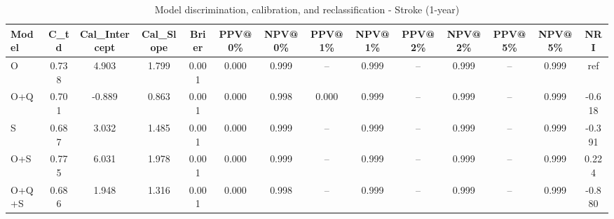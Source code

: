 \begin{table}[htbp]
\centering
\small
\caption{Model discrimination, calibration, and reclassification - Stroke (1-year)}
\label{tab:perf_stroke_1y}
\begin{tabular}{lccccccccccccc}
\toprule
Model & C\_td & Cal\_Intercept & Cal\_Slope & Brier & PPV@0\% & NPV@0\% & PPV@1\% & NPV@1\% & PPV@2\% & NPV@2\% & PPV@5\% & NPV@5\% & NRI \\
\midrule
O & 0.738 & 4.903 & 1.799 & 0.001 & 0.000 & 0.999 & -- & 0.999 & -- & 0.999 & -- & 0.999 & ref \\
O+Q & 0.701 & -0.889 & 0.863 & 0.001 & 0.000 & 0.998 & 0.000 & 0.999 & -- & 0.999 & -- & 0.999 & -0.618 \\
S & 0.687 & 3.032 & 1.485 & 0.001 & 0.000 & 0.999 & -- & 0.999 & -- & 0.999 & -- & 0.999 & -0.391 \\
O+S & 0.775 & 6.031 & 1.978 & 0.001 & 0.000 & 0.999 & -- & 0.999 & -- & 0.999 & -- & 0.999 & 0.224 \\
O+Q+S & 0.686 & 1.948 & 1.316 & 0.001 & 0.000 & 0.998 & -- & 0.999 & -- & 0.999 & -- & 0.999 & -0.880 \\
\bottomrule
\end{tabular}
\end{table}